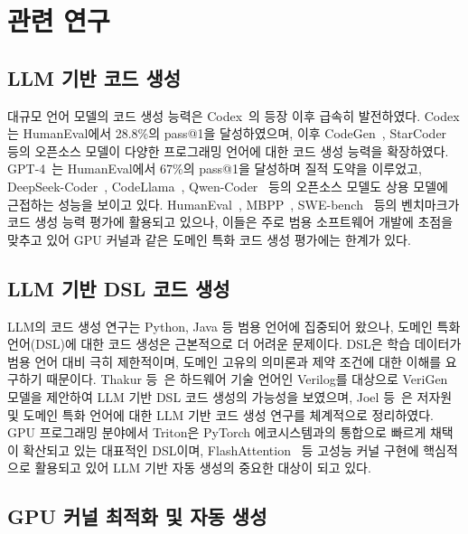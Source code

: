 \documentclass[sigplan,screen,review,anonymous]{acmart}
\begin{document}
\section{관련 연구}\label{sec:related}

\subsection{LLM 기반 코드 생성}

대규모 언어 모델의 코드 생성 능력은 Codex~\cite{chen2021codex}의 등장 이후 급속히 발전하였다.
Codex는 HumanEval에서 28.8\%의 pass@1을 달성하였으며,
이후 CodeGen~\cite{nijkamp2023codegen}, StarCoder~\cite{li2023starcoder} 등의
오픈소스 모델이 다양한 프로그래밍 언어에 대한 코드 생성 능력을 확장하였다.
GPT-4~\cite{openai2023gpt4}는 HumanEval에서 67\%의 pass@1을 달성하며 질적 도약을 이루었고,
DeepSeek-Coder~\cite{guo2024deepseek}, CodeLlama~\cite{roziere2023codellama},
Qwen-Coder~\cite{hui2024qwencoder} 등의 오픈소스 모델도 상용 모델에 근접하는 성능을 보이고 있다.
HumanEval~\cite{chen2021codex}, MBPP~\cite{austin2021mbpp},
SWE-bench~\cite{jimenez2024swebench} 등의 벤치마크가 코드 생성 능력 평가에 활용되고 있으나,
이들은 주로 범용 소프트웨어 개발에 초점을 맞추고 있어
GPU 커널과 같은 도메인 특화 코드 생성 평가에는 한계가 있다.

\subsection{LLM 기반 DSL 코드 생성}

LLM의 코드 생성 연구는 Python, Java 등 범용 언어에 집중되어 왔으나,
도메인 특화 언어(DSL)에 대한 코드 생성은 근본적으로 더 어려운 문제이다.
DSL은 학습 데이터가 범용 언어 대비 극히 제한적이며,
도메인 고유의 의미론과 제약 조건에 대한 이해를 요구하기 때문이다.
Thakur 등~\cite{thakur2024verigen}은 하드웨어 기술 언어인 Verilog를 대상으로
VeriGen 모델을 제안하여 LLM 기반 DSL 코드 생성의 가능성을 보였으며,
Joel 등~\cite{joel2024dsl_survey}은 저자원 및 도메인 특화 언어에 대한
LLM 기반 코드 생성 연구를 체계적으로 정리하였다.
GPU 프로그래밍 분야에서 Triton은 PyTorch 에코시스템과의 통합으로
빠르게 채택이 확산되고 있는 대표적인 DSL이며,
FlashAttention~\cite{dao2022flashattention, dao2023flashattention2} 등 고성능 커널 구현에
핵심적으로 활용되고 있어 LLM 기반 자동 생성의 중요한 대상이 되고 있다.

\subsection{GPU 커널 최적화 및 자동 생성}
\end{document}
